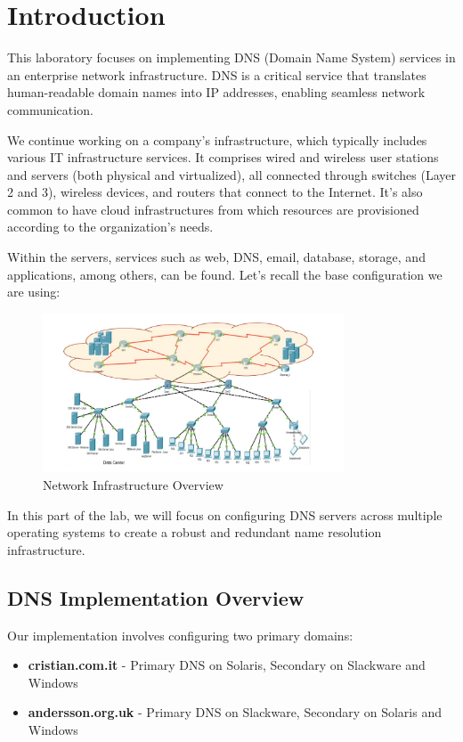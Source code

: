 \documentclass[12pt,a4paper]{article}
\begin{document}
\section{Introduction}\label{introduction}

This laboratory focuses on implementing DNS (Domain Name System) services in an enterprise network infrastructure. DNS is a critical service that translates human-readable domain names into IP addresses, enabling seamless network communication.

We continue working on a company's infrastructure, which typically includes various IT infrastructure services. It comprises wired and wireless user stations and servers (both physical and virtualized), all connected through switches (Layer 2 and 3), wireless devices, and routers that connect to the Internet. It's also common to have cloud infrastructures from which resources are provisioned according to the organization's needs.

Within the servers, services such as web, DNS, email, database, storage, and applications, among others, can be found. Let's recall the base configuration we are using:

\begin{figure}[h]
    \centering
    \includegraphics[width=0.8\textwidth]{media/image1.png}
    \caption{Network Infrastructure Overview}
    \label{fig:network_overview}
\end{figure}

In this part of the lab, we will focus on configuring DNS servers across multiple operating systems to create a robust and redundant name resolution infrastructure.

\subsection{DNS Implementation Overview}
Our implementation involves configuring two primary domains:
\begin{itemize}
    \item \textbf{cristian.com.it} - Primary DNS on Solaris, Secondary on Slackware and Windows
    \item \textbf{andersson.org.uk} - Primary DNS on Slackware, Secondary on Solaris and Windows
\end{itemize}
\end{document}
